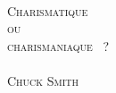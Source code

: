 
\pagestyle{empty}

\begin{titlepage}
\begin{center}
\mbox{}
\vfill
\HRule \\[0.4cm]
\textsc{ \Huge Charismatique\\ ou\\[0.4cm] \og charismaniaque \fg{}~?}\\[0.4cm]

\HRule \\[1.5cm]
\textsc{\Large Chuck Smith}\\[1.5cm]
\vfill
\mbox{}
\end{center}
\end{titlepage}

